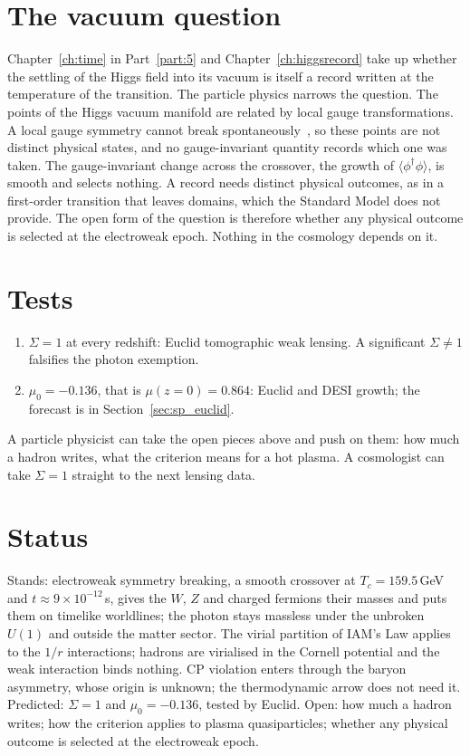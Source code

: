 \section{The vacuum question}\label{sec:ew:vacuum}
Chapter~\ref{ch:time} in Part~\ref{part:5} and Chapter~\ref{ch:higgsrecord} take up whether the settling of the Higgs field into its vacuum is itself a record written at
the temperature of the transition. The particle physics narrows the question. The points of the Higgs vacuum manifold are related by local gauge
transformations. A local gauge symmetry cannot break spontaneously~\cite{Elitzur1975}, so these points are not distinct physical states, and no
gauge-invariant quantity records which one was taken. The gauge-invariant change across the crossover, the growth of $\langle\phi^\dagger\phi\rangle$,
is smooth and selects nothing. A record needs distinct physical outcomes, as in a first-order transition that leaves domains, which the Standard Model
does not provide. The open form of the question is therefore whether any physical outcome is selected at the electroweak epoch. Nothing in the
cosmology depends on it. \openprob

\section{Tests}\label{sec:ew:tests}
\begin{enumerate}
\item $\Sigma=1$ at every redshift: Euclid tomographic weak lensing. A significant $\Sigma\neq1$ falsifies the photon exemption. \prediction
\item $\mu_0=-0.136$, that is $\mu(z{=}0)=0.864$: Euclid and DESI growth; the forecast is in Section~\ref{sec:sp_euclid}. \prediction
\end{enumerate}

A particle physicist can take the open pieces above and push on them: how much a hadron writes, what the criterion means for a hot plasma. A cosmologist can take $\Sigma=1$ straight to the next lensing data.

\section{Status}
Stands: electroweak symmetry breaking, a smooth crossover at $T_c=159.5$\,GeV and $t\approx9\times10^{-12}$\,s, gives the $W$, $Z$ and charged fermions
their masses and puts them on timelike worldlines; the photon stays massless under the unbroken $U(1)$ and outside the matter sector. \derived{} The
virial partition of IAM's Law applies to the $1/r$ interactions; hadrons are virialised in the Cornell potential and the weak interaction binds
nothing. \derived{} CP violation enters through the baryon asymmetry, whose origin is unknown; the thermodynamic arrow does not need it. Predicted:
$\Sigma=1$ and $\mu_0=-0.136$, tested by Euclid. \prediction{} Open: how much a hadron writes; how the criterion applies to plasma quasiparticles; whether
any physical outcome is selected at the electroweak epoch. \openprob
